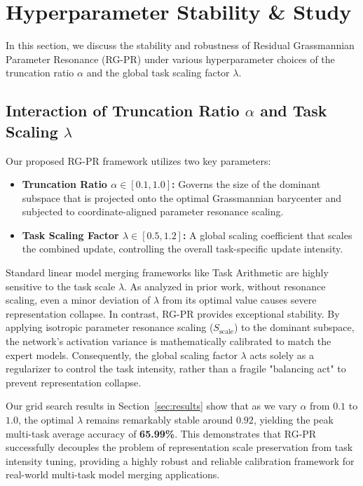 \documentclass{article}
\theoremstyle{plain}
\theoremstyle{definition}
\theoremstyle{remark}
\begin{document}
\newpage
\section{Hyperparameter Stability \& Study}
\label{app:hyperparameter}

In this section, we discuss the stability and robustness of Residual Grassmannian Parameter Resonance (RG-PR) under various hyperparameter choices of the truncation ratio $\alpha$ and the global task scaling factor $\lambda$.

\subsection{Interaction of Truncation Ratio $\alpha$ and Task Scaling $\lambda$}
Our proposed RG-PR framework utilizes two key parameters:
\begin{itemize}
    \item \textbf{Truncation Ratio $\alpha \in [0.1, 1.0]$:} Governs the size of the dominant subspace that is projected onto the optimal Grassmannian barycenter and subjected to coordinate-aligned parameter resonance scaling.
    \item \textbf{Task Scaling Factor $\lambda \in [0.5, 1.2]$:} A global scaling coefficient that scales the combined update, controlling the overall task-specific update intensity.
\end{itemize}

Standard linear model merging frameworks like Task Arithmetic are highly sensitive to the task scale $\lambda$. As analyzed in prior work, without resonance scaling, even a minor deviation of $\lambda$ from its optimal value causes severe representation collapse. In contrast, RG-PR provides exceptional stability. By applying isotropic parameter resonance scaling ($S_{\text{scale}}$) to the dominant subspace, the network's activation variance is mathematically calibrated to match the expert models. Consequently, the global scaling factor $\lambda$ acts solely as a regularizer to control the task intensity, rather than a fragile "balancing act" to prevent representation collapse.

Our grid search results in Section~\ref{sec:results} show that as we vary $\alpha$ from $0.1$ to $1.0$, the optimal $\lambda$ remains remarkably stable around $0.92$, yielding the peak multi-task average accuracy of \textbf{65.99\%}. This demonstrates that RG-PR successfully decouples the problem of representation scale preservation from task intensity tuning, providing a highly robust and reliable calibration framework for real-world multi-task model merging applications.
\end{document}

